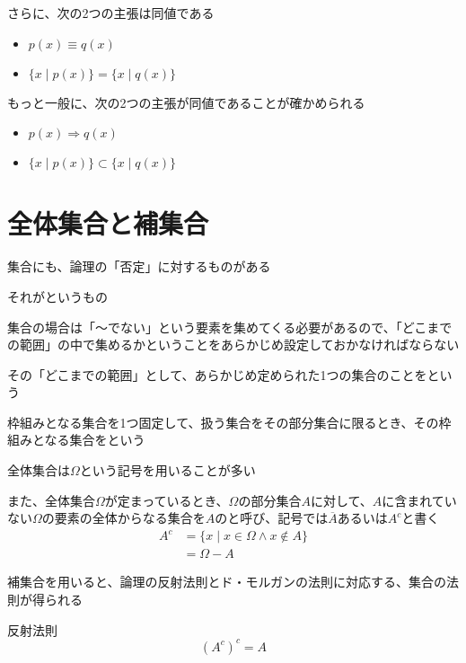 \documentclass[b5paper,12pt]{jsarticle}
\begin{document}
\br

さらに、次の2つの主張は同値である
\begin{itemize}
  \item $p(x) \equiv q(x)$
  \item $\{x \mid p(x)\} = \{x \mid q(x)\}$
\end{itemize}

\br

もっと一般に、次の2つの主張が同値であることが確かめられる
\begin{itemize}
  \item $p(x) \Rightarrow q(x)$
  \item $\{x \mid p(x)\} \subset \{x \mid q(x)\}$
\end{itemize}

\sectionline
\section{全体集合と補集合}

集合にも、論理の「否定」に対するものがある

それがというもの

\br

集合の場合は「〜でない」という要素を集めてくる必要があるので、「どこまでの範囲」の中で集めるかということをあらかじめ設定しておかなければならない

その「どこまでの範囲」として、あらかじめ定められた1つの集合のことをという

\sectionline

枠組みとなる集合を1つ固定して、扱う集合をその部分集合に限るとき、その枠組みとなる集合をという

全体集合は$\Omega $という記号を用いることが多い

\br

また、全体集合$\Omega $が定まっているとき、$\Omega$の部分集合$A$に対して、$A$に含まれていない$\Omega$の要素の全体からなる集合を$A$のと呼び、記号では$\overline{A}$あるいは$A^c$と書く
\begin{align*}
  A^c & = \{x \mid x \in \Omega \land x \notin A\} \\
      & = \Omega - A
\end{align*}

\sectionline

補集合を用いると、論理の反射法則とド・モルガンの法則に対応する、集合の法則が得られる

\begin{theorem}{反射法則}
  \begin{equation*}
    (A^c)^c = A
  \end{equation*}
\end{theorem}
\end{document}
